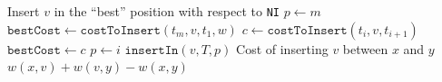 \begin{algorithm}[H]
\caption{}
\begin{algorithmic}[1]
 \Comment Insert $v$ in the ``best'' position with respect to \texttt{NI}
    \State $p \gets m$
    \State $\texttt{bestCost} \gets \texttt{costToInsert}(t_m, v, t_1,w)$
        \State $c \gets \texttt{costToInsert}(t_i,v,t_{i+1})$
            \State $\texttt{bestCost} \gets c$
            \State $p \gets i$
        \EndIf
    \EndFor
    \State
    \State $\texttt{insertIn}(v, T, p)$
\EndFunction
\State
{} \Comment Cost of inserting $v$ between $x$ and $y$
    \State \Return  $w(x,v)+w(v,y)-w(x,y)$
\EndFunction
\end{algorithmic}
\end{algorithm}

    

    


    
    
    
